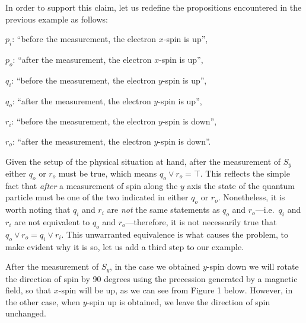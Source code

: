 \documentclass[11pt, executivepaper]{article}
\begin{document}
In order to support this claim, let us redefine the propositions encountered in the previous example as follows:
\begin{description}
	\item $p_i$: ``before the measurement, the electron $x$-spin is up'', 
	\item $p_o$: ``after the measurement, the electron $x$-spin is up'', 
	\item $q_i$: ``before the measurement, the electron $y$-spin is up'',
	\item $q_o$: ``after the measurement, the electron $y$-spin is up'',
	\item $r_i$: ``before the measurement, the electron $y$-spin is down'',
	\item $r_o$: ``after the measurement, the electron $y$-spin is down''.
\end{description}
\noindent Given the setup of the physical situation at hand, after the measurement of $S_y$ either $q_o$ or $r_o$ must be true, which means $q_o \vee r_o = \top$. This reflects the simple fact that \emph{after} a measurement of spin along the $y$ axis the state of the quantum particle must be one of the two indicated in either $q_o$ or $r_o$. Nonetheless, it is worth noting that $q_i$ and $r_i$ are \emph{not} the same statements as $q_o$ and $r_o$---i.e.\ $q_i$ and $r_i$ are not equivalent to $q_o$ and $r_o$---therefore, it is not necessarily true that $q_o \vee r_o = q_i \vee r_i$. This unwarranted equivalence is what causes the problem, to make evident why it is so, let us add a third step to our example. 

After the measurement of $S_y$, in the case we obtained $y$-spin down we will rotate the direction of spin by 90 degrees using the precession generated by a magnetic field, so that $x$-spin will be up, as we can see from Figure 1 below. However, in the other case, when $y$-spin up is obtained, we leave the direction of spin unchanged.
\end{document}
